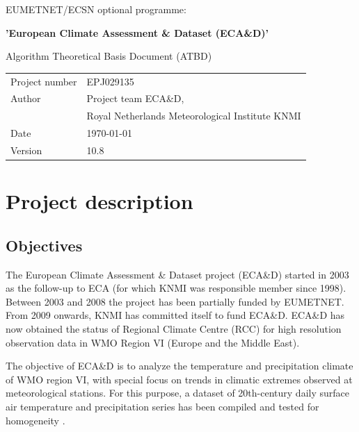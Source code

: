 \documentclass[a4paper,11pt]{article}
\begin{document}
\vspace{2cm}
\pagestyle{empty}

{\Large{EUMETNET/ECSN optional programme:}}
\vspace{1cm}

{\Large{\textbf{'European Climate Assessment \& Dataset (ECA\&D)'}}}
\vspace{1cm}

{\Large{Algorithm Theoretical Basis Document (ATBD)}}
\vspace{10cm}

\begin{tabular}{l@{: }l}
Project number & EPJ029135\\
Author & Project team ECA\&D,\\
& Royal Netherlands Meteorological Institute KNMI\\
Date & \today \\
Version & 10.8\\
\end{tabular}

\newpage
{}
\pagestyle{plain}

\tableofcontents

\newpage

\section{Project description}

\subsection{Objectives}
\label{sec:obj}

The European Climate Assessment \& Dataset project (ECA\&D) started in
2003 as the follow-up to ECA (for which KNMI was responsible member
since 1998). Between 2003 and 2008 the project has been partially
funded by EUMETNET. From 2009 onwards, KNMI has committed itself to
fund ECA\&D.
ECA\&D has now obtained the status of Regional Climate Centre (RCC)
for high resolution observation data in WMO Region VI (Europe and
the Middle East). 

The objective of ECA\&D is to analyze the temperature and
precipitation climate of WMO region VI, with special focus on trends
in climatic extremes observed at meteorological stations. For this
purpose, a dataset of 20th-century daily surface air temperature and
precipitation series has been compiled \citep{kleintank2002} and
tested for homogeneity \citep{wijngaard}.
\end{document}
